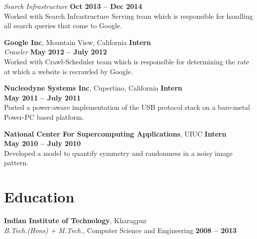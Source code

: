 \documentclass[margin,line]{resume}
\begin{document}
\begin{resume}
    \textsl{Search Infrastructure} \hfill \textbf{Oct 2013 -- Dec 2014}\vspace{1.5mm}\\\vspace{0mm}%
   Worked with Search Infrastructure Serving team which is responsible for handling all search queries that come to Google. 

    \textbf{Google Inc}, Mountain View, California \hfill \textbf{Intern} \vspace{2mm}\\\vspace{1mm}%
    \textsl{Crawler} \hfill \textbf{May 2012 -- July 2012}\\
    Worked with Crawl-Scheduler team which is responsible for determining the rate at which a website is recrawled by Google.

    \textbf{Nucleodyne Systems Inc}, Cupertino, California \hfill \textbf{Intern} \vspace{2mm}\\\vspace{1mm}%
    \hfill \textbf{May 2011 -- July 2011}\\
    Ported a power-aware implementation of the USB protocol stack on a bare-metal Power-PC based platform.

   \textbf{National Center For Supercomputing Applications}, UIUC \hfill \textbf{Intern} \vspace{2mm}\\\vspace{1mm}%
    \hfill \textbf{May 2010 -- July 2010}\\
    Developed a model to quantify symmetry and randomness in a noisy image pattern.

    \section{\mysidestyle Education}

    \textbf{Indian Institute of Technology}, Kharagpur \vspace{2mm}\\\vspace{1mm}%
    \textsl{B.Tech.(Hons) + M.Tech.}, Computer Science and Engineering \hfill \textbf{ 2008 -- 2013}\vspace{-3mm}\\\vspace{-1mm}%


\end{resume}
\end{document}
